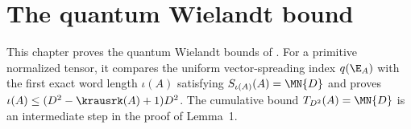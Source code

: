 \chapter{The quantum Wielandt bound}\label{ch:wielandt}

This chapter proves the quantum Wielandt bounds of
\cite{Sanz2010Quantum}. For a primitive normalized tensor, it compares the
uniform vector-spreading index $q(\E_A)$ with the first exact word length
$\iota(A)$ satisfying $S_{\iota(A)}(A)=\MN{D}$ and proves
$\iota(A)\le(D^2-\krausrk(A)+1)D^2$. The cumulative bound
$T_{D^2}(A)=\MN{D}$ is an intermediate step in the proof of Lemma~1.



